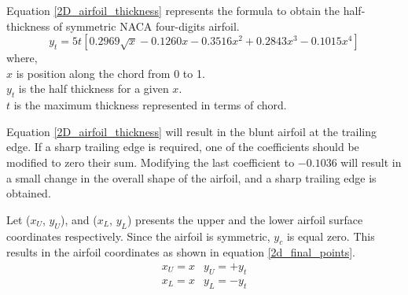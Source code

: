 Equation \ref{2D_airfoil_thickness} represents the formula to obtain the half-thickness of symmetric NACA four-digits airfoil.
\begin{equation}
y_{t}=5 t\left[0.2969 \sqrt{x}-0.1260 x-0.3516 x^{2}+0.2843 x^{3}-0.1015 x^{4}\right]
\label{2D_airfoil_thickness}
\end{equation}
where,\\
$x$ is position along the chord from 0 to 1.\\
$y_t$ is the half thickness for a given $x$.\\
$t$ is the maximum thickness represented in terms of chord.

Equation \ref{2D_airfoil_thickness} will result in the blunt airfoil at the trailing edge. If a sharp trailing edge is required, one of the coefficients should be modified to zero their sum. Modifying the last coefficient to $-0.1036$ will result in a small change in the overall shape of the airfoil, and a sharp trailing edge is obtained. 

Let ($x_U$, $y_U$), and ($x_L$, $y_L$) presents the upper and the lower airfoil surface coordinates respectively. Since the airfoil is symmetric, $y_c$ is equal zero.
This results in the airfoil coordinates as shown in equation \ref{2d_final_points}.
\begin{equation}
\begin{array}{ll}
x_{U}=x & y_{U}= +y_{t} \\
x_{L}=x & y_{L}= -y_{t}
\end{array}
\label{2d_final_points}
\end{equation}

